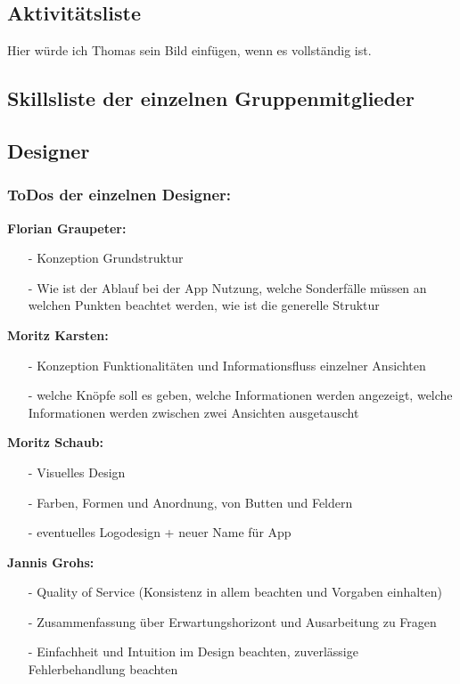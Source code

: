 \documentclass[12pt,a4paper]{article}
\begin{document}
\subsection{Aktivitätsliste}
 Hier würde ich Thomas sein Bild einfügen, wenn es vollständig ist.
 
 \subsection{Skillsliste der einzelnen Gruppenmitglieder}
 
 \newpage
 
\subsection{Designer}
\subsubsection*{ToDos der einzelnen Designer:}
\textbf{Florian Graupeter:}
\begin{itemize}
\item[-]Konzeption Grundstruktur
\item[-]Wie ist der Ablauf bei der App Nutzung, welche Sonderfälle müssen an welchen Punkten beachtet werden, wie ist die generelle Struktur
\end{itemize}
\textbf{Moritz Karsten:}
\begin{itemize}
\item[-]Konzeption Funktionalitäten und Informationsfluss einzelner Ansichten
\item[-]welche Knöpfe soll es geben, welche Informationen werden angezeigt, welche Informationen werden zwischen zwei Ansichten ausgetauscht
\end{itemize}
\textbf{Moritz Schaub:}
\begin{itemize}
\item[-]Visuelles Design
\item[-]Farben, Formen und Anordnung, von Butten und Feldern 
\item[-]eventuelles Logodesign + neuer Name für App
\end{itemize}
\textbf{Jannis Grohs:}
\begin{itemize}
\item[-]Quality of Service (Konsistenz in allem beachten und Vorgaben einhalten)
\item[-]Zusammenfassung über Erwartungshorizont und Ausarbeitung zu Fragen
\item[-]Einfachheit und Intuition im Design beachten, zuverlässige Fehlerbehandlung beachten
\end{itemize}
\end{document}
